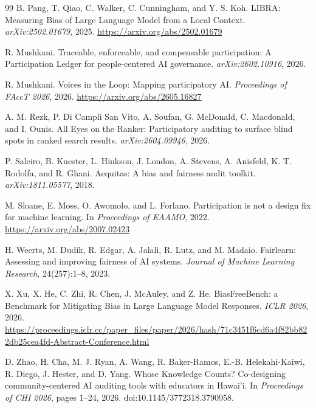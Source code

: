 \documentclass[10pt]{article}
\begin{document}
\begin{thebibliography}{99}
B. Pang, T. Qiao, C. Walker, C. Cunningham, and Y. S. Koh.
LIBRA: Measuring Bias of Large Language Model from a Local Context.
\emph{arXiv:2502.01679}, 2025.
\url{https://arxiv.org/abs/2502.01679}

R. Mushkani.
Traceable, enforceable, and compensable participation: A Participation Ledger
for people-centered AI governance.
\emph{arXiv:2602.10916}, 2026.

R. Mushkani.
Voices in the Loop: Mapping participatory AI.
\emph{Proceedings of FAccT 2026}, 2026.
\url{https://arxiv.org/abs/2605.16827}

A. M. Rezk, P. Di Campli San Vito, A. Soufan, G. McDonald, C. Macdonald,
and I. Ounis.
All Eyes on the Ranker: Participatory auditing to surface blind spots in ranked
search results.
\emph{arXiv:2604.09946}, 2026.

P. Saleiro, B. Kuester, L. Hinkson, J. London, A. Stevens, A. Anisfeld,
K. T. Rodolfa, and R. Ghani.
Aequitas: A bias and fairness audit toolkit.
\emph{arXiv:1811.05577}, 2018.

M. Sloane, E. Moss, O. Awomolo, and L. Forlano.
Participation is not a design fix for machine learning.
In \emph{Proceedings of EAAMO}, 2022.
\url{https://arxiv.org/abs/2007.02423}

H. Weerts, M. Dud\'ik, R. Edgar, A. Jalali, R. Lutz, and M. Madaio.
Fairlearn: Assessing and improving fairness of AI systems.
\emph{Journal of Machine Learning Research}, 24(257):1--8, 2023.

X. Xu, X. He, C. Zhi, R. Chen, J. McAuley, and Z. He.
BiasFreeBench: a Benchmark for Mitigating Bias in Large Language Model Responses.
\emph{ICLR 2026}, 2026.
\url{https://proceedings.iclr.cc/paper_files/paper/2026/hash/71c3451f6cd6a4f82bb822db25cea4fd-Abstract-Conference.html}

D. Zhao, H. Cha, M. J. Ryan, A. Wang, R. Baker-Ramos,
E.-B. Helekahi-Kaiwi, R. Diego, J. Hester, and D. Yang.
Whose Knowledge Counts? Co-designing community-centered AI auditing tools with
educators in Hawai'i.
In \emph{Proceedings of CHI 2026}, pages 1--24, 2026.
doi:10.1145/3772318.3790958.

\end{thebibliography}
\end{document}
